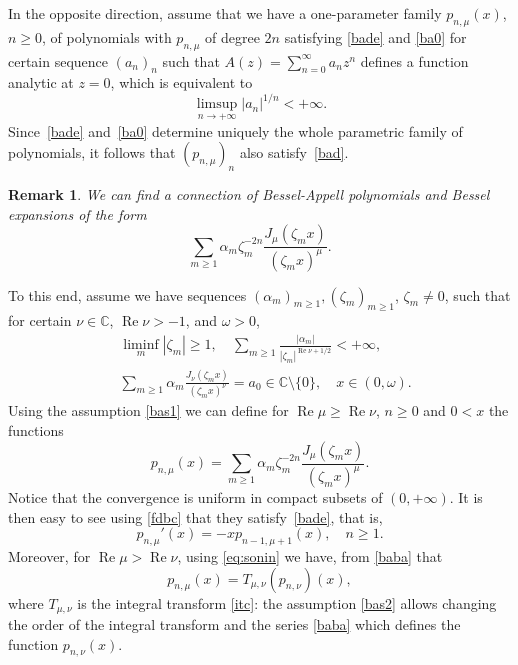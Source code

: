 \documentclass[12pt,leqno]{amsart}
\numberwithin{equation}{section}
\theoremstyle{plain}
\newtheorem{remark}[theorem]{Remark}
\newcommand{\CC}{\mathbb{C}}
\renewcommand{\Re}{\operatorname{Re}}
\begin{document}
In the opposite direction, assume that we have a one-parameter family $p_{n,\mu}(x)$, $n\ge 0$, of polynomials with $p_{n,\mu}$ of degree $2n$ satisfying \eqref{bade} and \eqref{ba0} for certain sequence $(a_n)_n$ such that
$A(z)= \sum _{n=0}^\infty a_nz^n$ defines a function analytic at $z=0$, which is equivalent to
\begin{equation}
\label{bath}
\limsup_{n\to +\infty} |a_n|^{1/n} < +\infty.
\end{equation}
Since~\eqref{bade} and~\eqref{ba0} determine uniquely the whole parametric family of polynomials, it follows that $(p_{n,\mu})_n$ also satisfy~\eqref{bad}.

\begin{remark}
\label{cositas}
We can find a connection of Bessel-Appell polynomials and Bessel expansions of the form
\begin{equation}
\label{bsj}
\sum_{m\ge 1}\alpha_m\zeta_m^{-2n} \frac{J_{\mu}(\zeta_m x)}{(\zeta_m x)^\mu}.
\end{equation}
\end{remark}

To this end, assume we have sequences $(\alpha_m)_{m\ge 1}, (\zeta_m)_{m\ge 1}$, $\zeta_m\not=0$, such that for certain $\nu\in \CC$, $\Re \nu>-1$, and $\omega>0$,
\begin{align}
\label{bas1}
& \liminf_m |\zeta_m| \ge 1, \quad \sum_{m\ge 1}
\frac{|\alpha_m|}{|\zeta_m|^{\Re \nu +1/2}} < +\infty, \\
\label{bas2}
& \sum_{m\ge 1}\alpha_m \frac{J_{\nu}(\zeta_m x)}{(\zeta_m x)^\nu} 
= a_0 \in \CC\setminus\{0\},\quad \mbox{$x\in (0,\omega)$.}
\end{align}
Using the assumption \eqref{bas1} we can define for $\Re\mu\ge \Re \nu$, $n\ge 0$ and $0<x$ the functions
\begin{equation}
\label{baba}
p_{n,\mu}(x)= \sum_{m\ge 1}\alpha_m\zeta_m^{-2n} \frac{J_{\mu}(\zeta_m x)}{(\zeta_m x)^\mu}.
\end{equation}
Notice that the convergence is uniform in compact subsets of $(0,+\infty)$. It is then easy to see using \eqref{fdbc} that they satisfy~\eqref{bade}, that is,
\begin{equation*}
p_{n,\mu}'(x) = -xp_{n-1,\mu+1}(x),\quad n\ge 1.
\end{equation*}
Moreover, for $\Re \mu>\Re \nu$, using \eqref{eq:sonin} we have, from \eqref{baba} that
\begin{equation}
\label{bamn}
p_{n,\mu}(x) = T_{\mu,\nu}(p_{n,\nu})(x),
\end{equation}
where $T_{\mu,\nu}$ is the integral transform \eqref{itc}: the assumption \eqref{bas2} allows changing the order of the integral transform and the series \eqref{baba} which defines the function $p_{n,\nu}(x)$.
\end{document}
